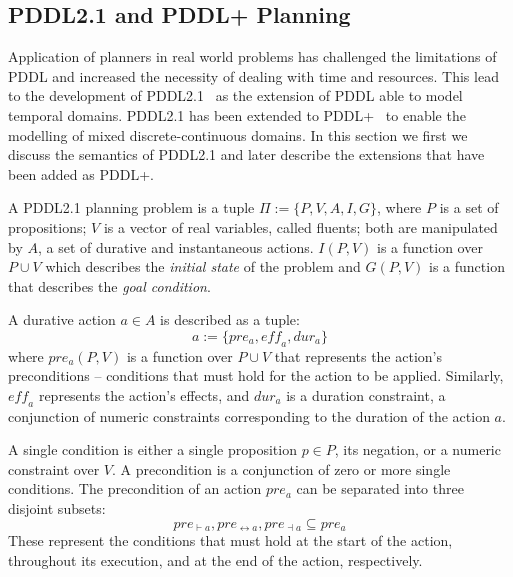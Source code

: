 \subsection{PDDL2.1 and PDDL+ Planning}

Application of planners in real world problems has challenged the limitations of PDDL and increased the necessity of dealing with time and resources. This lead to the development of PDDL2.1~\cite{fox03} as the extension of PDDL able to model temporal domains. PDDL2.1 has been extended to PDDL+~\cite{pddl+} to enable the modelling of mixed discrete-continuous domains. In this section we first we discuss the semantics of PDDL2.1 and later describe the extensions that have been added as PDDL+.

\begin{definition}\label{def:pddl21}
A PDDL2.1 planning problem is a tuple $\Pi:=\{P,V,A,I,G\}$, where $P$ is a set of propositions; $V$ is a vector of real variables, called fluents; both are manipulated by $A$, a set of durative and instantaneous actions.
$I(P,V)$ is a function over $P\cup V$ which describes the \textit{initial state} of the problem and $G(P,V)$ is a function that describes the \textit{goal condition}.
\end{definition}

A durative action $a \in A$ is described as a tuple:
$$
a:=\{pre_{a},\mathit{eff}_{a},dur_{a}\}
$$
where $pre_{a}(P,V)$ is a function over $P\cup V$ that represents the action's preconditions -- conditions that must hold for the action to be applied. Similarly, $\mathit{eff}_{a}$ represents the action's effects, and $dur_{a}$ is a duration constraint, a conjunction of numeric constraints corresponding to the duration of the action $a$.

A single condition is either a single proposition $p\in P$, its negation, or a numeric constraint over $V$. A precondition is a conjunction of zero or more single conditions. The precondition of an action $pre_a$ can be separated into three disjoint subsets:
$$
pre_{\vdash a}, pre_{\leftrightarrow a}, pre_{\dashv a}\subseteq pre_{a}
$$
These represent the conditions that must hold at the start of the action, throughout its execution, and at the end of the action, respectively.

